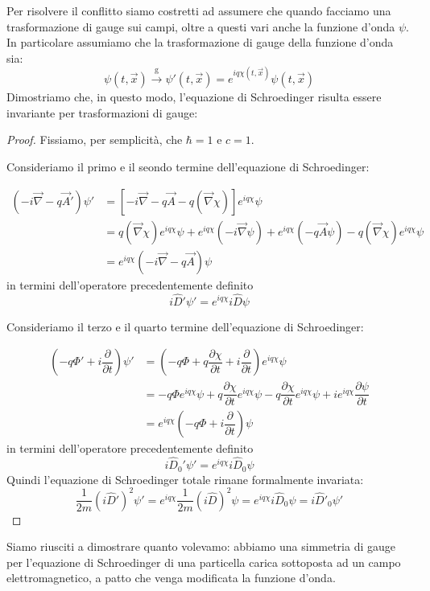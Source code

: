 Per risolvere il conflitto siamo costretti ad assumere che quando facciamo una trasformazione di gauge sui campi, oltre a questi vari anche la funzione d'onda $\psi$.
In particolare assumiamo che la trasformazione di gauge della funzione d'onda sia:
\begin{equation}
    \psi(t,\Vec{x})
   \xrightarrow[\text{}]{\text{g}}
  \psi'(t,\Vec{x})
    =e^{iq\chi(t,\Vec{x})}\psi(t,\Vec{x})
\end{equation}
Dimostriamo che, in questo modo, l'equazione di Schroedinger risulta essere invariante per trasformazioni di gauge:
    \begin{proof}
        Fissiamo, per  semplicità, che $\hbar=1$ e $c=1$.

Consideriamo il primo e il seondo termine dell'equazione di Schroedinger:

\begin{equation}
\begin{aligned}
   (-i\Vec{\nabla}-q\Vec{A}')\psi' &= \left[-i\Vec{\nabla}-q\Vec{A}-q(\Vec{\nabla}\chi)\right]e^{iq\chi}\psi\\
   &=q(\Vec{\nabla}\chi) e^{iq\chi}\psi+e^{iq\chi}(-i\Vec{\nabla}\psi)+e^{iq\chi}(-q\Vec{A}\psi)-q(\Vec{\nabla}\chi) e^{iq\chi}\psi\\
   &=e^{iq\chi}(-i\Vec{\nabla}-q\Vec{A})\psi
\end{aligned}
\end{equation}
in termini dell'operatore precedentemente definito
\begin{equation}
    i\hat{D}'\psi'=e^{iq\chi}i\hat{D}\psi
\end{equation}

Consideriamo il terzo e il quarto termine dell'equazione di Schroedinger:

\begin{equation}
\begin{aligned}
   \left(-q\Phi'+i\dfrac{\partial}{\partial t}\right)\psi' &= \left(-q\Phi+q\dfrac{\partial \chi}{\partial t}+i\dfrac{\partial}{\partial t}\right)e^{iq\chi}\psi\\
   &=-q\Phi e^{iq\chi}\psi+q\dfrac{\partial \chi}{\partial t}e^{iq\chi}\psi-q\dfrac{\partial \chi}{\partial t}e^{iq\chi}\psi+ie^{iq\chi}\dfrac{\partial \psi}{\partial t}\\
   &=e^{iq\chi}\left(-q\Phi+i\dfrac{\partial}{\partial t}\right)\psi
\end{aligned}
\end{equation}
in termini dell'operatore precedentemente definito
\begin{equation}
    i\hat{D}_0'\psi'=e^{iq\chi}i\hat{D}_0\psi
\end{equation}
Quindi l'equazione di Schroedinger totale rimane formalmente invariata:
\begin{equation}
     \dfrac{1}{2m}(i\hat{D}')^2\psi'= e^{iq\chi}\dfrac{1}{2m}(i\hat{D})^2\psi=e^{iq\chi}i\hat{D}_0\psi=i\hat{D}'_0\psi'
\end{equation}        
    \end{proof}
Siamo riusciti a dimostrare quanto volevamo: abbiamo una simmetria di gauge per l'equazione di Schroedinger di una particella carica sottoposta ad un campo elettromagnetico, a patto che venga modificata la funzione d'onda.


